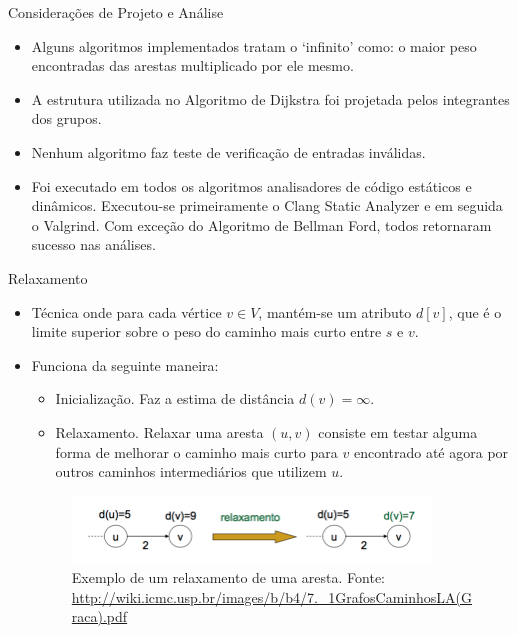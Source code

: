 \documentclass[aspectratio=169]{beamer}
\begin{document}
\begin{frame}{Considerações de Projeto e Análise}
	
	\begin{itemize}
		\item Alguns algoritmos implementados tratam o `infinito' como: o maior peso encontradas das arestas multiplicado por ele mesmo.
		
		\bigskip
		
		\item A estrutura utilizada no Algoritmo de Dijkstra foi projetada pelos integrantes dos grupos.
		
		\bigskip
		
		\item Nenhum algoritmo faz teste de verificação de entradas inválidas.
		
		\bigskip
		
		\item Foi executado em todos os algoritmos analisadores de código estáticos e dinâmicos. Executou-se primeiramente o Clang Static Analyzer e em seguida o Valgrind. Com exceção do Algoritmo de Bellman Ford, todos retornaram sucesso nas análises.
		
	\end{itemize}
\end{frame}



\begin{frame}{Relaxamento \cite{cormen2002algoritmos}}
	\begin{itemize}
		\item Técnica onde para cada vértice $v \in V$, mantém-se um atributo $d[v]$, que é o limite superior sobre o peso do caminho mais curto entre $s$ e $v$. 
		
		\item Funciona da seguinte maneira:
		\begin{itemize}
			\item Inicialização. Faz a estima de distância  $d(v)=\infty$.
			
			\item Relaxamento. Relaxar uma aresta $(u,v)$ consiste em testar alguma forma de melhorar o caminho mais curto para $v$ encontrado até agora por outros caminhos intermediários que utilizem $u$. 
		\end{itemize}
		
		\begin{figure}[H]
			\centering
			\includegraphics[width=0.9\textwidth]{img/relaxamento.png}
			\caption{Exemplo de um relaxamento de uma aresta. Fonte: \protect\url{http://wiki.icmc.usp.br/images/b/b4/7._1GrafosCaminhosLA(Graca).pdf}}
			\label{fig:relaxamento}
		\end{figure}
	\end{itemize}
\end{frame}
\end{document}
